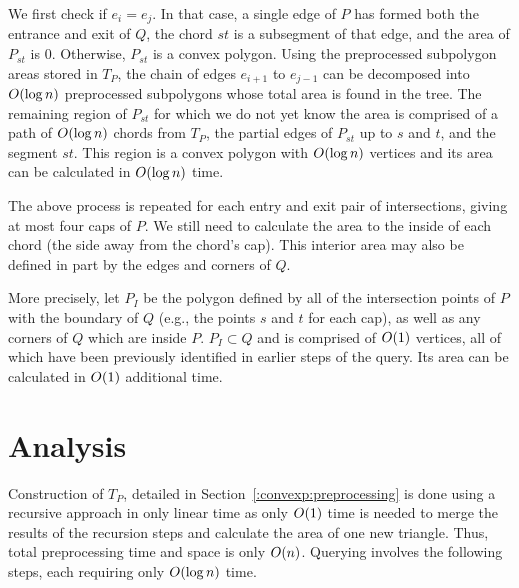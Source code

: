 We first check if $e_i = e_j$.
In that case, a single edge of $P$ has formed both the entrance and exit of $Q$, the chord $st$ is a subsegment of that edge, and the area of $P_{st}$ is 0.
Otherwise, $P_{st}$ is a convex polygon.
Using the preprocessed subpolygon areas stored in $T_P$, the chain of edges $e_{i+1}$ to $e_{j-1}$ can be decomposed into $O\!\left(\log{n}\right)$ preprocessed subpolygons whose total area is found in the tree.
The remaining region of $P_{st}$ for which we do not yet know the area is comprised of a path of $O\!\left(\log{n}\right)$ chords from $T_P$, the partial edges of $P_{st}$ up to $s$ and $t$, and the segment $st$.
This region is a convex polygon with $O\!\left(\log{n}\right)$ vertices and its area can be calculated in $O\!\left(\log{n}\right)$ time.

The above process is repeated for each entry and exit pair of intersections, giving at most four caps of $P$.
We still need to calculate the area to the inside of each chord (the side away from the chord's cap).
This interior area may also be defined in part by the edges and corners of $Q$. 

More precisely, let $P_I$ be the polygon defined by all of the intersection  points of $P$ with the boundary of $Q$ (e.g., the points $s$ and $t$ for each cap), as well as any corners of $Q$ which are inside $P$. $P_I \subset Q$ and is comprised of $O\!\left(1\right)$ vertices, all of which have been previously identified in earlier steps of the query. Its area can be calculated in $O\!\left(1\right)$ additional time.


\section{Analysis}
\label{:convexp:analysis}

Construction of $T_P$, detailed in Section~\ref{:convexp:preprocessing} is done using a recursive approach in only linear time as only $O\!\left(1\right)$ time is needed to merge the results of the recursion steps and calculate the area of one new triangle. 
Thus, total preprocessing time and space is only $O\!\left(n\right)$.
Querying involves the following steps, each requiring only $O\!\left(\log{n}\right)$ time.

